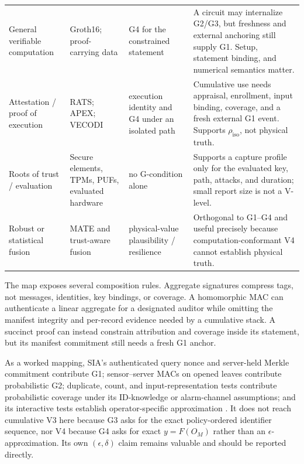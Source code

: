 \begin{table}[t]
\begin{tabular}{@{}L{2.0cm}L{2.25cm}L{1.6cm}L{5.4cm}@{}}
General verifiable computation & Groth16; proof-carrying data
\cite{groth2016,chiesa2010pcd} & G4 for the constrained statement & A circuit may
internalize G2/G3, but freshness and external anchoring still supply G1. Setup,
statement binding, and numerical semantics matter. \\

Attestation / proof of execution & RATS; APEX; VECODI
\cite{rfc9334,apex2020,vecodi2026} & execution identity and G4 under an isolated
path & Cumulative use needs appraisal, enrollment, input binding, coverage, and
a fresh external G1 event. Supports $\rho_{\mathrm{iso}}$, not physical truth. \\

Roots of trust / evaluation & Secure elements, TPMs, PUFs, evaluated hardware
& no G-condition alone & Supports a capture profile only for the evaluated key,
path, attacks, and duration; small report size is not a V-level. \\

Robust or statistical fusion & MATE and trust-aware fusion
\cite{mate2025} & physical-value plausibility / resilience &
Orthogonal to G1--G4 and useful precisely because computation-conformant V4
cannot establish physical truth. \\
\bottomrule
\end{tabular}
\end{table}

The map exposes several composition rules. Aggregate signatures compress tags,
not messages, identities, key bindings, or coverage. A homomorphic MAC can
authenticate a linear aggregate for a designated auditor while omitting the
manifest integrity and per-record evidence needed by a cumulative stack. A
succinct proof can instead constrain attribution and coverage inside its
statement, but its manifest commitment still needs a fresh G1 anchor.

As a worked mapping, SIA's authenticated query nonce and server-held Merkle
commitment contribute G1; sensor--server MACs on opened leaves contribute
probabilistic G2; duplicate, count, and input-representation tests contribute
probabilistic coverage under its ID-knowledge or alarm-channel assumptions;
and its interactive tests establish operator-specific approximation
\cite{przydatek2003sia}. It does not reach cumulative V3 here because G3 asks
for the exact policy-ordered identifier sequence, nor V4 because G4 asks for
exact $y=F(O_M)$ rather than an $\epsilon$-approximation. Its own
$(\epsilon,\delta)$ claim remains valuable and should be reported directly.

